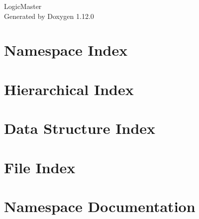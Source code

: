 \documentclass[twoside]{book}
\newcommand{\+}{\discretionary{\mbox{\scriptsize$\hookleftarrow$}}{}{}}
\newcommand{\clearemptydoublepage}{%
    \newpage{\pagestyle{empty}\cleardoublepage}%
  }
\begin{document}
  \raggedbottom
    \hypersetup{pageanchor=false,
                bookmarksnumbered=true,
                pdfencoding=unicode
               }
  \begin{titlepage}
  \vspace*{7cm}
  \begin{center}%
  {\Large Logic\+Master}\\
  \vspace*{1cm}
  {\large Generated by Doxygen 1.12.0}\\
  \end{center}
  \end{titlepage}
  \clearemptydoublepage
  \tableofcontents
  \clearemptydoublepage
  \hypersetup{pageanchor=true}
\chapter{Namespace Index}

\chapter{Hierarchical Index}

\chapter{Data Structure Index}

\chapter{File Index}

\chapter{Namespace Documentation}














\end{document}
